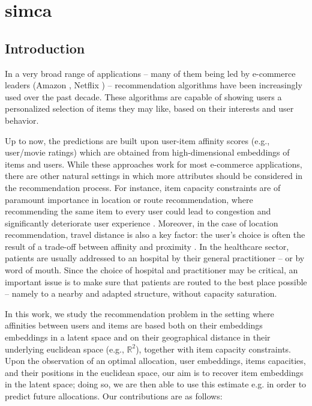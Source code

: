 \chapter{\acf{simca}}

\section{Introduction}

In a very broad range of applications -- many of them being led by e-commerce
leaders (Amazon \cite{linden_amazoncom_2003}, Netflix \cite{koren_matrix_2009})
-- recommendation algorithms have been increasingly used over the past decade.
These algorithms are capable of showing users a personalized selection of items
they may like, based on their interests and user behavior.

Up to now, the predictions are built upon user-item affinity scores (e.g.,
user/movie ratings) which are obtained from high-dimensional embeddings of items
and users. While these approaches work for most e-commerce applications, there
are other natural settings in which more attributes should be considered in the
recommendation process. For instance, item capacity constraints are of paramount
importance in location or route recommendation, where recommending the same item
to every user could lead to congestion and significantly deteriorate  user
experience \cite{christakopoulou_recommendation_2017}. Moreover, in the case of
location recommendation, travel distance is also a key factor: the user's choice
is often the result of a trade-off between affinity and proximity
\cite{zhao_survey_2016}. In the healthcare sector, patients are usually
addressed to an hospital by their general practitioner -- or by word of mouth.
Since the choice of hospital and practitioner may be critical, an important
issue is to make sure that patients are routed to the best place possible --
namely to a nearby and adapted structure, without capacity saturation.

In this work, we study the recommendation problem in the setting where
affinities between users and items are based both on their embeddings embeddings
in a latent space and on their geographical distance in their underlying
euclidean space (e.g., $\mathbb{R}^2$), together with item capacity constraints.
Upon the observation of an optimal allocation, user embeddings, items
capacities, and their positions in the euclidean space, our aim is to recover
item embeddings in the latent space; doing so, we are then able to use this
estimate e.g. in order to predict future allocations. Our contributions are as
follows:

